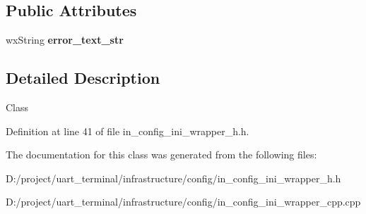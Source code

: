 \subsection*{Public Attributes}
\begin{DoxyCompactItemize}
\item 
\mbox{\label{classconfig__ini_a10c57c0e9ba366e9a7e2b45d38335b5e}} 
wx\+String {\bfseries error\+\_\+text\+\_\+str}
\end{DoxyCompactItemize}


\subsection{Detailed Description}
Class 

Definition at line 41 of file in\+\_\+config\+\_\+ini\+\_\+wrapper\+\_\+h.\+h.



The documentation for this class was generated from the following files\+:\begin{DoxyCompactItemize}
\item 
D\+:/project/uart\+\_\+terminal/infrastructure/config/in\+\_\+config\+\_\+ini\+\_\+wrapper\+\_\+h.\+h\item 
D\+:/project/uart\+\_\+terminal/infrastructure/config/in\+\_\+config\+\_\+ini\+\_\+wrapper\+\_\+cpp.\+cpp\end{DoxyCompactItemize}
